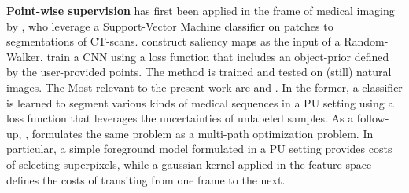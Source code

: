 \textbf{Point-wise supervision} has first been applied in the frame of medical imaging by \cite{vilarino2007}, who leverage a Support-Vector Machine classifier on patches to segmentations of CT-scans.
\cite{khosravan16} construct saliency maps as the input of a Random-Walker.
\cite{bearman16} train a CNN using a loss function that includes an object-prior defined by the user-provided points. The method is trained and tested on (still) natural images.
The Most relevant to the present work are \cite{lejeune17} and \cite{lejeune18}.
In the former, a classifier is learned to segment various kinds of medical sequences in a PU setting using a loss function that leverages the uncertainties of unlabeled samples.
As a follow-up, \cite{lejeune18}, formulates the same problem as a multi-path optimization problem. In particular, a simple foreground model formulated in a PU setting provides costs of selecting superpixels, while a gaussian kernel applied in the feature space defines the costs of transiting from one frame to the next.


